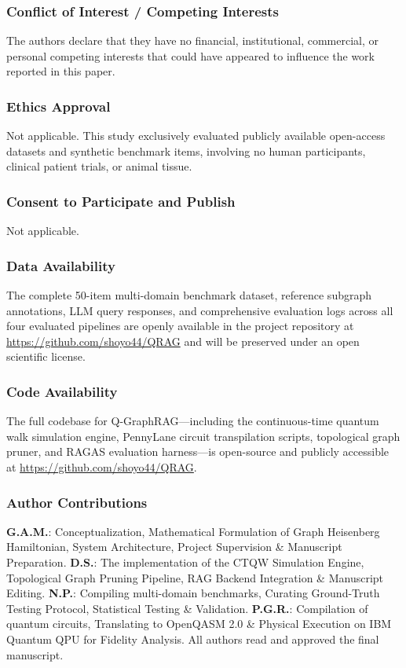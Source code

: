 \documentclass{llncs}
\begin{document}
\subsubsection*{Conflict of Interest / Competing Interests}
The authors declare that they have no financial, institutional, commercial, or personal competing interests that could have appeared to influence the work reported in this paper.

\subsubsection*{Ethics Approval}
Not applicable. This study exclusively evaluated publicly available open-access datasets and synthetic benchmark items, involving no human participants, clinical patient trials, or animal tissue.

\subsubsection*{Consent to Participate and Publish}
Not applicable.

\subsubsection*{Data Availability}
The complete 50-item multi-domain benchmark dataset, reference subgraph annotations, LLM query responses, and comprehensive evaluation logs across all four evaluated pipelines are openly available in the project repository at \url{https://github.com/shoyo44/QRAG} and will be preserved under an open scientific license.

\subsubsection*{Code Availability}
The full codebase for Q-GraphRAG---including the continuous-time quantum walk simulation engine, PennyLane circuit transpilation scripts, topological graph pruner, and RAGAS evaluation harness---is open-source and publicly accessible at \url{https://github.com/shoyo44/QRAG}.

\subsubsection*{Author Contributions}
\textbf{G.A.M.}: Conceptualization, Mathematical Formulation of Graph Heisenberg Hamiltonian, System Architecture, Project Supervision \& Manuscript Preparation.
\textbf{D.S.}: The implementation of the CTQW Simulation Engine, Topological Graph Pruning Pipeline, RAG Backend Integration \& Manuscript Editing.
\textbf{N.P.}: Compiling multi-domain benchmarks, Curating Ground-Truth Testing Protocol, Statistical Testing \& Validation.
\textbf{P.G.R.}: Compilation of quantum circuits, Translating to OpenQASM 2.0 \& Physical Execution on IBM Quantum QPU for Fidelity Analysis.
All authors read and approved the final manuscript.
\end{document}
